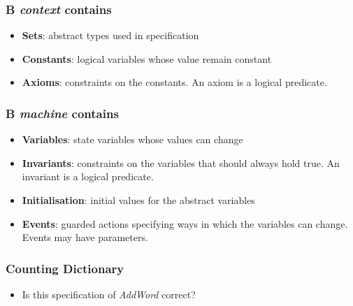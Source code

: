 \documentclass{beamer}
\begin{document}
\begin{frame}

\frametitle{B \textit{context} contains}
\begin{itemize} \setlength{\itemsep}{6pt}
\item \textbf{Sets}:    abstract types used in specification
\item \textbf{Constants}: logical variables whose value remain constant
\item \textbf{Axioms}: constraints on the constants.  An axiom is a logical predicate.
\end{itemize}


\end{frame}



\begin{frame}


\frametitle{B \textit{machine} contains}
\begin{itemize} \setlength{\itemsep}{6pt}
\item \textbf{Variables}:  state variables whose values can
change
\item \textbf{Invariants}: constraints on the variables that should
always hold true. An invariant is a logical predicate.
\item
\textbf{Initialisation}: initial values for the abstract variables
\item
\textbf{Events}:  guarded actions specifying ways in which the
variables can change.  Events may have parameters.
\end{itemize}


\end{frame}










\begin{frame}

\frametitle{Counting Dictionary}






\operations


\begin{itemize}
 \pause \item {Is this specification of \textit{AddWord} correct?}
\end{itemize}


\end{frame}
\end{document}
